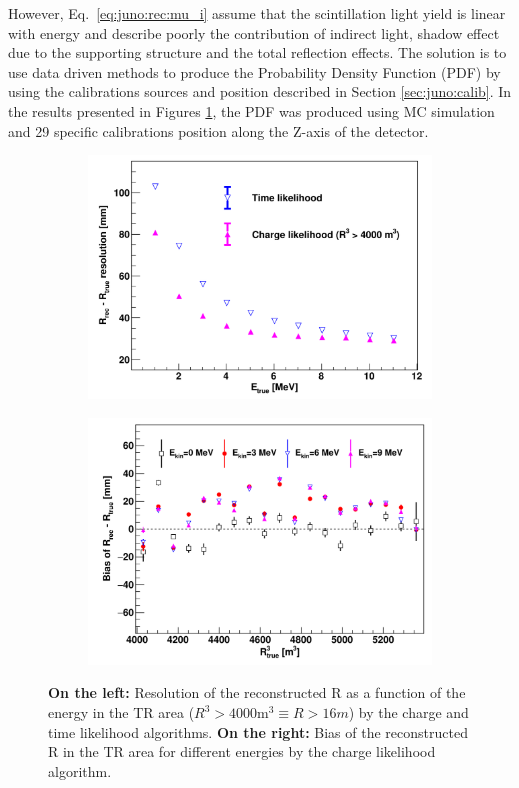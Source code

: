 \documentclass[../main.tex]{subfiles}
\begin{document}
However, Eq.\ \ref{eq:juno:rec:mu_i} assume that the scintillation light yield is linear with energy and describe poorly the contribution of indirect light, shadow effect due to the supporting structure and the total reflection effects. The solution is to use data driven methods to produce the Probability Density Function (PDF) by using the calibrations sources and position described in Section \ref{sec:juno:calib}. In the results presented in Figures \ref{fig:juno:rec:time_charge_results}, the PDF was produced using MC simulation and 29 specific calibrations position \cite{li_event_2021} along the Z-axis of the detector.
\begin{figure}[ht]
  \centering
  \begin{subfigure}[b]{0.48\linewidth}
    \centering
    \includegraphics[width=\textwidth]{images/juno/reco/charge_likelihood_res.png}
  \end{subfigure}
  \hfill
  \begin{subfigure}[b]{0.48\linewidth}
    \centering
    \includegraphics[width=\textwidth]{images/juno/reco/charge_likelihood_bias.png}
  \end{subfigure}
  \caption{\textbf{On the left:} Resolution of the reconstructed R as a function of the energy in the TR area ($R^3 > 4000 \mathrm{m}^3 \equiv R > 16 m$) by the charge and time likelihood algorithms. \textbf{On the right:} Bias of the reconstructed R in the TR area for different energies by the charge likelihood algorithm.}
  \label{fig:juno:rec:time_charge_results}
\end{figure}
\end{document}
